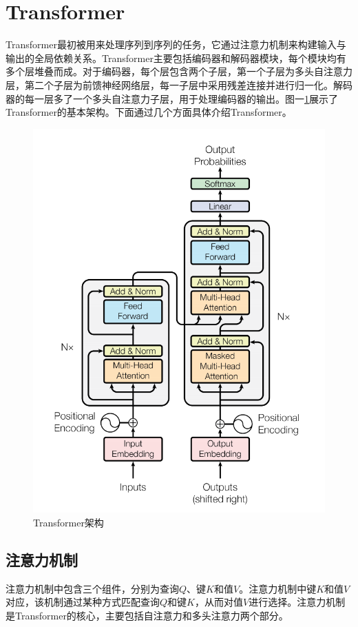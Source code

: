 \documentclass[journal]{IEEEtran}
\begin{document}
\section{Transformer}\label{Transformer}
Transformer\cite{vaswani2017attention}最初被用来处理序列到序列的任务，它通过注意力机制来构建输入与输出的全局依赖关系。Transformer主要包括编码器和解码器模块，每个模块均有多个层堆叠而成。对于编码器，每个层包含两个子层，第一个子层为多头自注意力层，第二个子层为前馈神经网络层，每一子层中采用残差连接并进行归一化。解码器的每一层多了一个多头自注意力子层，用于处理编码器的输出。图一\ref{figure1}展示了Transformer的基本架构。下面通过几个方面具体介绍Transformer。

\begin{figure}[h]
    \centering
    \includegraphics[width=\columnwidth]{image-1.png}
    \caption{Transformer架构}
    \label{figure1}
    \end{figure}

\subsection{注意力机制}
注意力机制中包含三个组件，分别为查询$Q$、键$K$和值$V$。注意力机制中键$K$和值$V$对应，该机制通过某种方式匹配查询$Q$和键$K$，从而对值$V$进行选择。注意力机制是Transformer的核心，主要包括自注意力和多头注意力两个部分。
\end{document}
